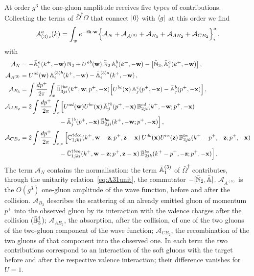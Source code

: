 At order $g^3$ the one-gluon amplitude receives five types of contributions. Collecting the terms of $\bar\Omega^\dagger\Omega$ that connect $\ket0$ with $\bra{g}$ at this order we find
\begin{align}\label{eq:A3amp}
\mathcal A^a_{(3)\,i}(k)=\int_w e^{-i\mathbf{k}\cdot\mathbf{w}}\Big\{\mathcal A_{N}+\mathcal A_{A^{(3)}}+\mathcal A_{B_3}+\mathcal A_{AB_2}+\mathcal A_{CB_2}\Big\}^a_i\,,
\end{align}
with
\begin{align}
\mathcal A_{N}&=-\bar{\mathbb{A}}^a_i(k^+,-\mathbf{w})\,\mathbb{N}_2+U^{ab}(\mathbf{w})\,\bar{\mathbb{N}}_2\,\mathbb{A}^b_i(k^+,-\mathbf{w})-\big[\bar{\mathbb{N}}_2,\bar{\mathbb{A}}^a_i(k^+,-\mathbf{w})\big]\,,
\notag\\
\mathcal A_{A^{(3)}}&=U^{ab}(\mathbf{w})\,\mathbb{A}^{(3)b}_i(k^+,-\mathbf{w})-\bar{\mathbb{A}}^{(3)a}_i(k^+,-\mathbf{w})\,,
\notag\\
\mathcal A_{B_3}&=\int\frac{dp^+}{2\pi}\int_x\bar{\mathbb{B}}^{\dagger ba}_{3ji}(k^+,\mathbf{w};p^+,-\mathbf{x})\Big[U^{bc}(\mathbf{x})\,\mathbb{A}^c_j(p^+,-\mathbf{x})-\bar{\mathbb{A}}^b_j(p^+,-\mathbf{x})\Big]\,,
\notag\\
\mathcal A_{AB_2}&=2\int\frac{dp^+}{2\pi}\int_x\Big[U^{ad}(\mathbf{w})U^{bc}(\mathbf{x})\,\bar{\mathbb{A}}^{\dagger b}_j(p^+,-\mathbf{x})\,\mathbb{B}^{cd}_{2ji}(k^+,-\mathbf{w};p^+,-\mathbf{x})
\notag\\&\hspace{2.2cm}
-\bar{\mathbb{A}}^{\dagger b}_j(p^+,-\mathbf{x})\,\bar{\mathbb{B}}^{ba}_{2ji}(k^+,-\mathbf{w};p^+,-\mathbf{x})\Big]\,,
\notag\\
\mathcal A_{CB_2}&=2\int\frac{dp^+}{2\pi}\int_{x,z}\Big[\bar{\mathbb{C}}^{\dagger dca}_{1jki}(k^+,\mathbf{w}-\mathbf{z};p^+,\mathbf{z}-\mathbf{x})\,U^{db}(\mathbf{x})U^{ce}(\mathbf{z})\,\mathbb{B}^{be}_{2jk}(k^+-p^+,-\mathbf{z};p^+,-\mathbf{x})
\notag\\&\hspace{2.2cm}
-\bar{\mathbb{C}}^{\dagger bca}_{1jki}(k^+,\mathbf{w}-\mathbf{z};p^+,\mathbf{z}-\mathbf{x})\,\bar{\mathbb{B}}^{bc}_{2jk}(k^+-p^+,-\mathbf{z};p^+,-\mathbf{x})\Big]\,.
\end{align}
The term $\mathcal A_N$ contains the normalisation: the term $\bar{\mathbb{A}}^{(3)}_1$ of $\bar\Omega^\dagger$ contributes, through the unitarity relation~\eqref{eq:A31unit}, the commutator $-[\bar{\mathbb{N}}_2,\bar{\mathbb{A}}]$. $\mathcal A_{A^{(3)}}$ is the $O(g^3)$ one-gluon amplitude of the wave function, before and after the collision. $\mathcal A_{B_3}$ describes the scattering of an already emitted gluon of momentum $p^+$ into the observed gluon by its interaction with the valence charges after the collision ($\bar{\mathbb{B}}_3^\dagger$); $\mathcal A_{AB_2}$, the absorption, after the collision, of one of the two gluons of the two-gluon component of the wave function; $\mathcal A_{CB_2}$, the recombination of the two gluons of that component into the observed one. In each term the two contributions correspond to an interaction of the soft gluons with the target before and after the respective valence interaction; their difference vanishes for $U=1$.

